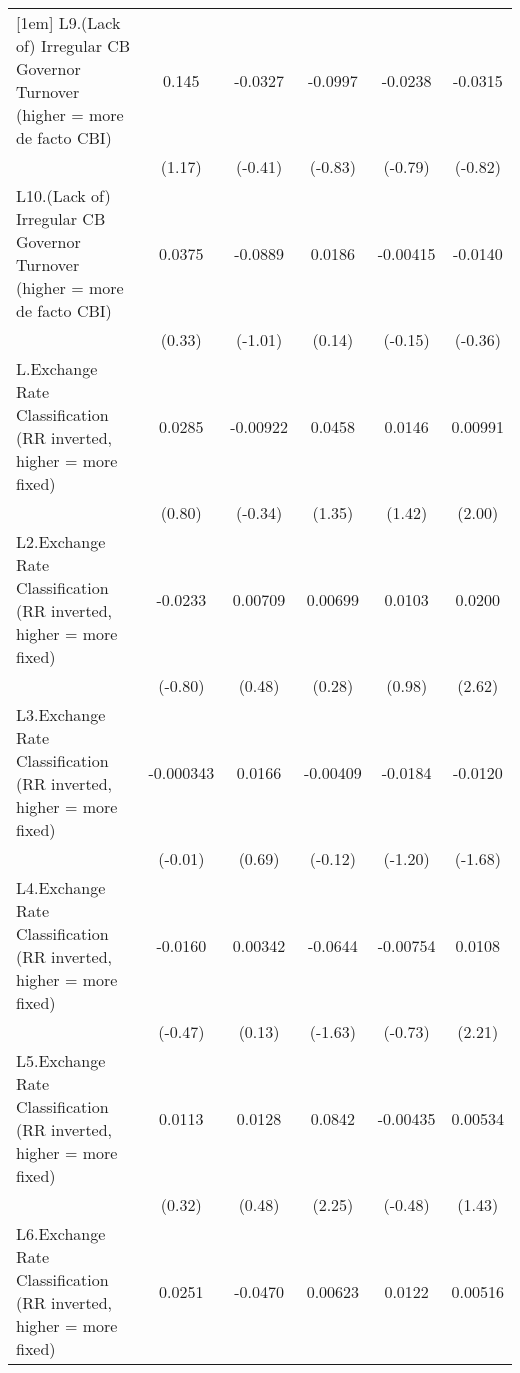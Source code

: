 {\begin{longtable}{l*{5}{c}}
[1em]
L9.(Lack of) Irregular CB Governor Turnover (higher = more de facto CBI)&    0.145         &  -0.0327         &  -0.0997         &  -0.0238         &  -0.0315         \\
                &   (1.17)         &  (-0.41)         &  (-0.83)         &  (-0.79)         &  (-0.82)         \\
[1em]
L10.(Lack of) Irregular CB Governor Turnover (higher = more de facto CBI)&   0.0375         &  -0.0889         &   0.0186         & -0.00415         &  -0.0140         \\
                &   (0.33)         &  (-1.01)         &   (0.14)         &  (-0.15)         &  (-0.36)         \\
[1em]
L.Exchange Rate Classification (RR inverted, higher = more fixed)&   0.0285         & -0.00922         &   0.0458         &   0.0146         &  0.00991\sym{*}  \\
                &   (0.80)         &  (-0.34)         &   (1.35)         &   (1.42)         &   (2.00)         \\
[1em]
L2.Exchange Rate Classification (RR inverted, higher = more fixed)&  -0.0233         &  0.00709         &  0.00699         &   0.0103         &   0.0200\sym{**} \\
                &  (-0.80)         &   (0.48)         &   (0.28)         &   (0.98)         &   (2.62)         \\
[1em]
L3.Exchange Rate Classification (RR inverted, higher = more fixed)&-0.000343         &   0.0166         & -0.00409         &  -0.0184         &  -0.0120         \\
                &  (-0.01)         &   (0.69)         &  (-0.12)         &  (-1.20)         &  (-1.68)         \\
[1em]
L4.Exchange Rate Classification (RR inverted, higher = more fixed)&  -0.0160         &  0.00342         &  -0.0644         & -0.00754         &   0.0108\sym{*}  \\
                &  (-0.47)         &   (0.13)         &  (-1.63)         &  (-0.73)         &   (2.21)         \\
[1em]
L5.Exchange Rate Classification (RR inverted, higher = more fixed)&   0.0113         &   0.0128         &   0.0842\sym{*}  & -0.00435         &  0.00534         \\
                &   (0.32)         &   (0.48)         &   (2.25)         &  (-0.48)         &   (1.43)         \\
[1em]
L6.Exchange Rate Classification (RR inverted, higher = more fixed)&   0.0251         &  -0.0470         &  0.00623         &   0.0122         &  0.00516         \\

\end{longtable}}
